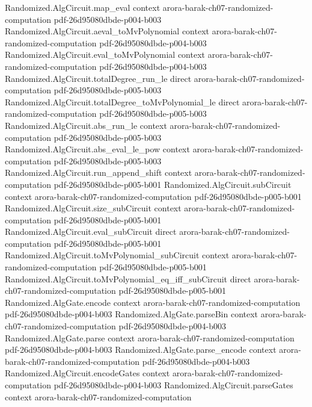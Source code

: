 \begin{theorem}
\proofstep
  {Randomized.AlgCircuit.map_eval}
  {context}
  {arora-barak-ch07-randomized-computation}
  {pdf-26d95080dbde-p004-b003}
\proofstep
  {Randomized.AlgCircuit.aeval_toMvPolynomial}
  {context}
  {arora-barak-ch07-randomized-computation}
  {pdf-26d95080dbde-p004-b003}
\proofstep
  {Randomized.AlgCircuit.eval_toMvPolynomial}
  {context}
  {arora-barak-ch07-randomized-computation}
  {pdf-26d95080dbde-p004-b003}
\proofstep
  {Randomized.AlgCircuit.totalDegree_run_le}
  {direct}
  {arora-barak-ch07-randomized-computation}
  {pdf-26d95080dbde-p005-b003}
\proofstep
  {Randomized.AlgCircuit.totalDegree_toMvPolynomial_le}
  {direct}
  {arora-barak-ch07-randomized-computation}
  {pdf-26d95080dbde-p005-b003}
\proofstep
  {Randomized.AlgCircuit.abs_run_le}
  {context}
  {arora-barak-ch07-randomized-computation}
  {pdf-26d95080dbde-p005-b003}
\proofstep
  {Randomized.AlgCircuit.abs_eval_le_pow}
  {context}
  {arora-barak-ch07-randomized-computation}
  {pdf-26d95080dbde-p005-b003}
\proofstep
  {Randomized.AlgCircuit.run_append_shift}
  {context}
  {arora-barak-ch07-randomized-computation}
  {pdf-26d95080dbde-p005-b001}
\proofstep
  {Randomized.AlgCircuit.subCircuit}
  {context}
  {arora-barak-ch07-randomized-computation}
  {pdf-26d95080dbde-p005-b001}
\proofstep
  {Randomized.AlgCircuit.size_subCircuit}
  {context}
  {arora-barak-ch07-randomized-computation}
  {pdf-26d95080dbde-p005-b001}
\proofstep
  {Randomized.AlgCircuit.eval_subCircuit}
  {direct}
  {arora-barak-ch07-randomized-computation}
  {pdf-26d95080dbde-p005-b001}
\proofstep
  {Randomized.AlgCircuit.toMvPolynomial_subCircuit}
  {context}
  {arora-barak-ch07-randomized-computation}
  {pdf-26d95080dbde-p005-b001}
\proofstep
  {Randomized.AlgCircuit.toMvPolynomial_eq_iff_subCircuit}
  {direct}
  {arora-barak-ch07-randomized-computation}
  {pdf-26d95080dbde-p005-b001}
\proofstep
  {Randomized.AlgGate.encode}
  {context}
  {arora-barak-ch07-randomized-computation}
  {pdf-26d95080dbde-p004-b003}
\proofstep
  {Randomized.AlgGate.parseBin}
  {context}
  {arora-barak-ch07-randomized-computation}
  {pdf-26d95080dbde-p004-b003}
\proofstep
  {Randomized.AlgGate.parse}
  {context}
  {arora-barak-ch07-randomized-computation}
  {pdf-26d95080dbde-p004-b003}
\proofstep
  {Randomized.AlgGate.parse_encode}
  {context}
  {arora-barak-ch07-randomized-computation}
  {pdf-26d95080dbde-p004-b003}
\proofstep
  {Randomized.AlgCircuit.encodeGates}
  {context}
  {arora-barak-ch07-randomized-computation}
  {pdf-26d95080dbde-p004-b003}
\proofstep
  {Randomized.AlgCircuit.parseGates}
  {context}
  {arora-barak-ch07-randomized-computation}

\end{theorem}
